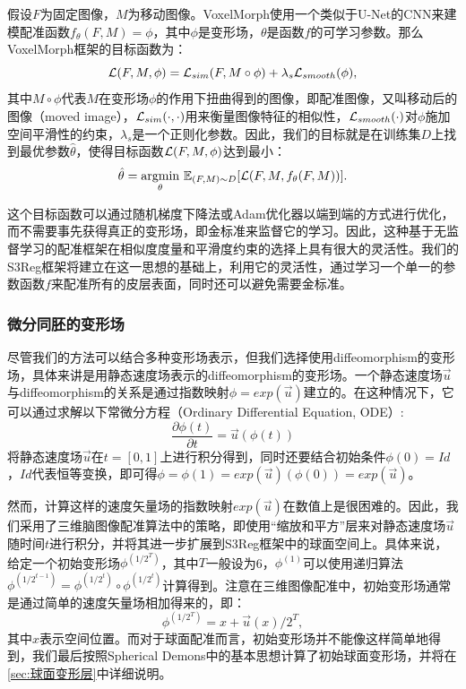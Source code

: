 假设$F$为固定图像，$M$为移动图像。VoxelMorph使用一个类似于U-Net的CNN来建模配准函数$f_{\theta}(F,M)=\phi$，其中$\phi$是变形场，$\theta$是函数$f$的可学习参数。那么VoxelMorph框架的目标函数为：
\begin{equation}\label{eq:3-1}
{\cal L}(F,M,\phi)={\cal L}_{sim}(F,M\circ{\phi})+\lambda_s{{\cal L}_{smooth}(\phi)},
\end{equation}
其中$M\circ\phi$代表$M$在变形场$\phi$的作用下扭曲得到的图像，即配准图像，又叫移动后的图像（moved image），${\cal L}_{sim}(\cdot,\cdot)$用来衡量图像特征的相似性，${\cal L}_{smooth}(\cdot)$对$\phi$施加空间平滑性的约束，$\lambda_s$是一个正则化参数。因此，我们的目标就是在训练集$D$上找到最优参数$\hat{\theta}$，使得目标函数${\cal L}(F,M,\phi)$达到最小：
\begin{equation}
\hat{\theta}=\underset{\theta}{\mathrm{argmin}}~\mathbb{E}_{(F,M)\sim D}[{\cal L}(F,M,f_{\theta}(F,M))].
\end{equation}

这个目标函数可以通过随机梯度下降法或Adam优化器\cite{kingma2014adam}以端到端的方式进行优化，而不需要事先获得真正的变形场，即金标准来监督它的学习。因此，这种基于无监督学习的配准框架在相似度度量和平滑度约束的选择上具有很大的灵活性。我们的S3Reg框架将建立在这一思想的基础上，利用它的灵活性，通过学习一个单一的参数函数$f$来配准所有的皮层表面，同时还可以避免需要金标准。

\subsubsection{微分同胚的变形场}\label{sec:微分同胚的变形场}
尽管我们的方法可以结合多种变形场表示，但我们选择使用diffeomorphism的变形场，具体来讲是用静态速度场表示的diffeomorphism的变形场。一个静态速度场$\overrightarrow{u}$与diffeomorphism的关系是通过指数映射$\phi=exp(\overrightarrow{u})$建立的。在这种情况下，它可以通过求解以下常微分方程（Ordinary Differential Equation, ODE）:
\begin{equation}
{\frac{\partial \phi(t)}{\partial t} }=\overrightarrow{u}(\phi(t))
\end{equation}
将静态速度场$\overrightarrow{u}$在$t=[0,1]$上进行积分得到，同时还要结合初始条件$\phi(0)=Id$，$Id$代表恒等变换，即可得$\phi=\phi(1)=exp(\overrightarrow{u})(\phi(0))=exp(\overrightarrow{u})$。

然而，计算这样的速度矢量场的指数映射$exp(\overrightarrow{u})$在数值上是很困难的。因此，我们采用了三维脑图像配准算法中的策略\cite{dalca2018unsupervised,krebs2019learning}，即使用“缩放和平方”层\cite{arsigny2006log}来对静态速度场$\overrightarrow{u}$随时间$t$进行积分，并将其进一步扩展到S3Reg框架中的球面空间上。具体来说，给定一个初始变形场$\phi^{(1/2^T)}$，其中$T$一般设为6，$\phi^{(1)}$可以使用递归算法$\phi^{(1/2^{t-1})}=\phi^{(1/2^t)}\circ\phi^{(1/2^t)}$计算得到。注意在三维图像配准中，初始变形场通常是通过简单的速度矢量场相加得来的，即：
\begin{equation}
\phi^{(1/2^T)}=x+\overrightarrow{u}(x)/2^T,
\end{equation}
其中$x$表示空间位置。而对于球面配准而言，初始变形场并不能像这样简单地得到，我们最后按照Spherical Demons中的基本思想\cite{yeo2009spherical}计算了初始球面变形场，并将在\ref{sec:球面变形层}中详细说明。

